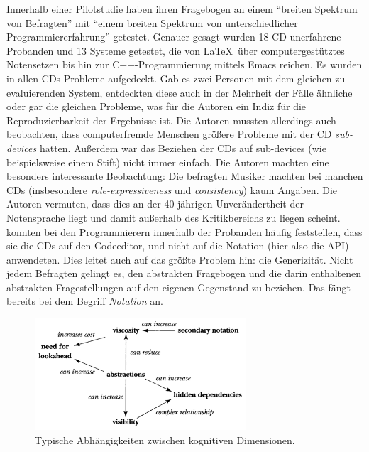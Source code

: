 \begin{important}
Innerhalb einer Pilotstudie haben \cite{161956} ihren Fragebogen an einem ``breiten Spektrum von Befragten'' mit ``einem breiten Spektrum von unterschiedlicher Programmiererfahrung'' getestet. Genauer gesagt wurden 18 CD-unerfahrene Probanden und 13 Systeme getestet, die von \LaTeX\ über computergestütztes Notensetzen bis hin zur C++-Programmierung mittels Emacs reichen. Es wurden in allen CDs Probleme aufgedeckt. Gab es zwei Personen mit dem gleichen zu evaluierenden System, entdeckten diese auch in der Mehrheit der Fälle ähnliche oder gar die gleichen Probleme, was für die Autoren ein Indiz für die Reproduzierbarkeit der Ergebnisse ist. Die Autoren mussten allerdings auch beobachten, dass computerfremde Menschen größere Probleme mit der CD \emph{sub-devices} hatten. Außerdem war das Beziehen der CDs auf sub-devices (wie beispielsweise einem Stift) nicht immer einfach. Die Autoren machten eine besonders interessante Beobachtung: Die befragten Musiker machten bei manchen CDs (insbesondere \textit{role-expressiveness} und \textit{consistency}) kaum Angaben. Die Autoren vermuten, dass dies an der 40-jährigen Unverändertheit der Notensprache liegt und damit außerhalb des Kritikbereichs zu liegen scheint. \cite{161956} konnten bei den Programmierern innerhalb der Probanden häufig feststellen, dass sie die CDs auf den Codeeditor, und nicht auf die Notation (hier also die API) anwendeten. Dies leitet auch auf das größte Problem hin: die Generizität. Nicht jedem Befragten gelingt es, den abstrakten Fragebogen und die darin enthaltenen abstrakten Fragestellungen auf den eigenen Gegenstand zu beziehen. Das fängt bereits bei dem Begriff \emph{Notation} an.
\end{important}

\begin{figure}
  \centering
    \includegraphics[width=0.7\textwidth]{Figures/CD-TradeOffs.png}
  \caption{Typische Abhängigkeiten zwischen kognitiven Dimensionen.\\\citep{carroll2003hci}}
  \label{fig:CDTradeOffs}
\end{figure}




